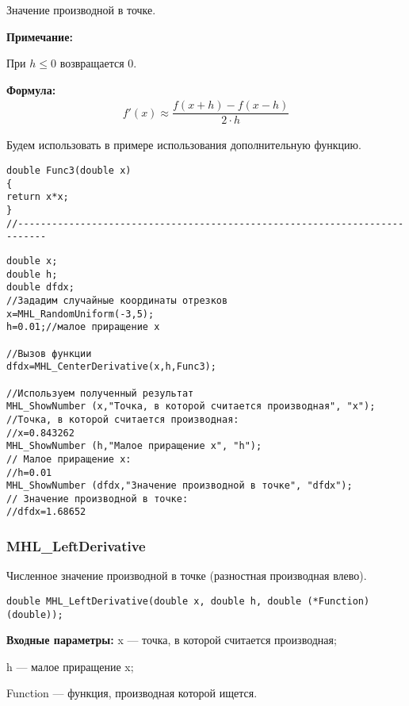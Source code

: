 \documentclass[a4paper,12pt]{article}
\begin{document}
 Значение производной в точке.
 
 \textbf{Примечание:}
 
 При $h\leq0$ возвращается $0$.

\textbf{Формула:}
\begin{eqnarray*}
f'\left( x\right) \approx \dfrac{f\left( x+h\right)-f\left( x-h\right) }{2\cdot h}
\end{eqnarray*}

Будем использовать в примере использования дополнительную функцию.

\begin{lstlisting}[caption=Дополнительная функция]
double Func3(double x)
{
return x*x;
}
//---------------------------------------------------------------------------
\end{lstlisting}


\begin{lstlisting}[label=code_use_MHL_CenterDerivative,caption=Пример использования]
double x;
double h;
double dfdx;
//Зададим случайные координаты отрезков
x=MHL_RandomUniform(-3,5);
h=0.01;//малое приращение x

//Вызов функции
dfdx=MHL_CenterDerivative(x,h,Func3);

//Используем полученный результат
MHL_ShowNumber (x,"Точка, в которой считается производная", "x");
//Точка, в которой считается производная:
//x=0.843262
MHL_ShowNumber (h,"Малое приращение x", "h");
// Малое приращение x:
//h=0.01
MHL_ShowNumber (dfdx,"Значение производной в точке", "dfdx");
// Значение производной в точке:
//dfdx=1.68652
\end{lstlisting}

\subsubsection{MHL\_LeftDerivative}\label{MHL_LeftDerivative}

Численное значение производной в точке (разностная производная влево).


\begin{lstlisting}[label=code_syntax_MHL_LeftDerivative,caption=Синтаксис]
double MHL_LeftDerivative(double x, double h, double (*Function)(double));
\end{lstlisting}

\textbf{Входные параметры:}
 x --- точка, в которой считается производная;
 
 h --- малое приращение x;
 
 Function --- функция, производная которой ищется.
\end{document}
